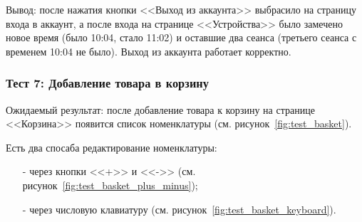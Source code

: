 


Вывод:
после нажатия кнопки <<Выход из аккаунта>> выбрасило на страницу входа в аккаунт, а после входа
на странице <<Устройства>> было замечено новое время (было 10:04, стало 11:02) и оставшие два сеанса
(третьего сеанса с временем 10:04 не было). Выход из аккаунта работает корректно.

\subsubsection*{Тест 7: Добавление товара в корзину}

Ожидаемый результат: после добавление товара к корзину на странице <<Корзина>> появится список номенклатуры (см. рисунок~\ref{fig:test_basket}).





Есть два спосаба редактирование номенклатуры:
\begin{itemize}
    \item[-] через кнопки <<+>> и <<->> (см. рисунок~\ref{fig:test_basket_plus_minus});
    \item[-] через числовую клавиатуру (см. рисунок~\ref{fig:test_basket_keyboard}).
\end{itemize}

